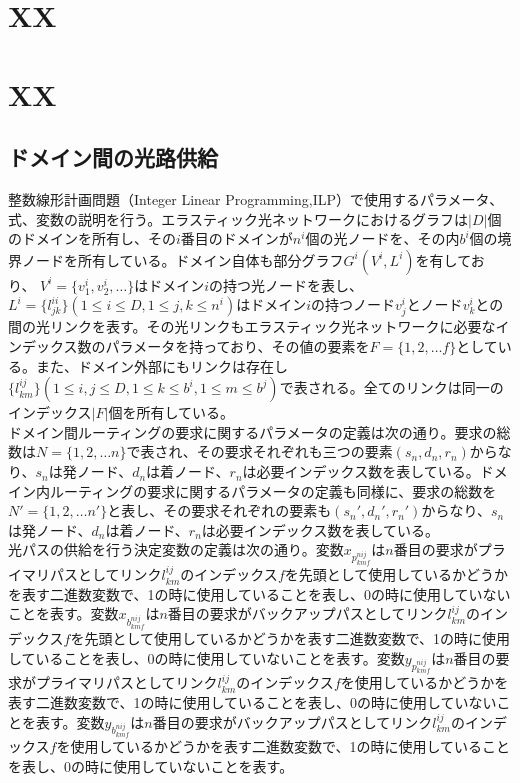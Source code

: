\documentclass[a4j,twocolumn,fleqn]{jarticle}
\begin{document}
 
\Title
\section{XX}

\section{XX}
%
\subsection{ドメイン間の光路供給}
整数線形計画問題（Integer Linear Programming,ILP）で使用するパラメータ、式、変数の説明を行う。エラスティック光ネットワークにおけるグラフは$|D|$個のドメインを所有し、その$i$番目のドメインが$n^i$個の光ノードを、その内$b^i$個の境界ノードを所有している。ドメイン自体も部分グラフ$G^i (V^i ,L^i)$を有しており、 $V^i = \{v^i_1,v^i_2, \dots \} $はドメイン$i$の持つ光ノードを表し、$L^i = \{l^{ii}_{jk}\}(1\leq i \leq D,1\leq j,k \leq n^i)$はドメイン$i$の持つノード$v^i_j$とノード$v^i_k$との間の光リンクを表す。その光リンクもエラスティック光ネットワークに必要なインデックス数のパラメータを持っており、その値の要素を$F=\{1,2,\dots f\}$としている。また、ドメイン外部にもリンクは存在し$\{l^{ij}_{km}\}(1\leq i,j\leq D,1\leq k\leq b^i,1\leq m \leq b^j)$で表される。全てのリンクは同一のインデックス$|F|$個を所有している。\\
ドメイン間ルーティングの要求に関するパラメータの定義は次の通り。要求の総数は$N=\{1,2,\dots n\}$で表され、その要求それぞれも三つの要素$(s_n,d_n,r_n)$からなり、$s_n$は発ノード、$d_n$は着ノード、$r_n$は必要インデックス数を表している。ドメイン内ルーティングの要求に関するパラメータの定義も同様に、要求の総数を$N'=\{1,2,\dots n'\}$と表し、その要求それぞれの要素も$(s_n',d_n',r_n')$からなり、$s_n$は発ノード、$d_n$は着ノード、$r_n$は必要インデックス数を表している。\\
光パスの供給を行う決定変数の定義は次の通り。変数$x_{p^{nij}_{kmf}}$は$n$番目の要求がプライマリパスとしてリンク$l^{ij}_{km}$のインデックス$f$を先頭として使用しているかどうかを表す二進数変数で、1の時に使用していることを表し、0の時に使用していないことを表す。変数$x_{b^{nij}_{kmf}}$は$n$番目の要求がバックアップパスとしてリンク$l^{ij}_{km}$のインデックス$f$を先頭として使用しているかどうかを表す二進数変数で、1の時に使用していることを表し、0の時に使用していないことを表す。変数$y_{p^{nij}_{kmf}}$は$n$番目の要求がプライマリパスとしてリンク$l^{ij}_{km}$のインデックス$f$を使用しているかどうかを表す二進数変数で、1の時に使用していることを表し、0の時に使用していないことを表す。変数$y_{b^{nij}_{kmf}}$は$n$番目の要求がバックアップパスとしてリンク$l^{ij}_{km}$のインデックス$f$を使用しているかどうかを表す二進数変数で、1の時に使用していることを表し、0の時に使用していないことを表す。\\
\end{document}
